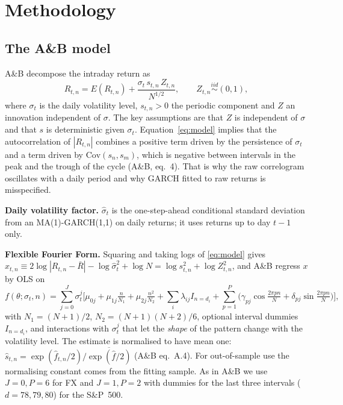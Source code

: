 \documentclass[11pt,a4paper]{article}
\begin{document}
\section{Methodology}
\label{sec:method}
\subsection{The A\&B model}
A\&B decompose the intraday return as
\begin{equation}
R_{t,n}=E(R_{t,n})+\frac{\sigma_t\,s_{t,n}\,Z_{t,n}}{N^{1/2}},\qquad Z_{t,n}\overset{iid}{\sim}(0,1),
\label{eq:model}
\end{equation}
where $\sigma_t$ is the daily volatility level, $s_{t,n}>0$ the periodic component and $Z$ an innovation independent of $\sigma$. The key assumptions are that $Z$ is independent of $\sigma$ and that $s$ is deterministic given $\sigma_t$. Equation~\eqref{eq:model} implies that the autocorrelation of $|R_{t,n}|$ combines a positive term driven by the persistence of $\sigma_t$ and a term driven by $\mathrm{Cov}(s_n,s_m)$, which is negative between intervals in the peak and the trough of the cycle (A\&B, eq.~4). That is why the raw correlogram oscillates with a daily period and why GARCH fitted to raw returns is misspecified.

\textbf{Daily volatility factor.} $\hat\sigma_t$ is the one-step-ahead conditional standard deviation from an MA(1)-GARCH(1,1) on daily returns; it uses returns up to day $t-1$ only.

\textbf{Flexible Fourier Form.} Squaring and taking logs of \eqref{eq:model} gives
$x_{t,n}\equiv 2\log|R_{t,n}-\bar R|-\log\hat\sigma_t^2+\log N=\log s_{t,n}^2+\log Z_{t,n}^2$, and A\&B regress $x$ by OLS on
\begin{equation}
f(\theta;\sigma_t,n)=\sum_{j=0}^{J}\sigma_t^j\Big[\mu_{0j}+\mu_{1j}\tfrac{n}{N_1}+\mu_{2j}\tfrac{n^2}{N_2}+\sum_{i}\lambda_{ij}I_{n=d_i}+\sum_{p=1}^{P}\big(\gamma_{pj}\cos\tfrac{2\pi pn}{N}+\delta_{pj}\sin\tfrac{2\pi pn}{N}\big)\Big],
\label{eq:fff}
\end{equation}
with $N_1=(N+1)/2$, $N_2=(N+1)(N+2)/6$, optional interval dummies $I_{n=d_i}$, and interactions with $\sigma_t^j$ that let the \emph{shape} of the pattern change with the volatility level. The estimate is normalised to have mean one: $\hat s_{t,n}=\exp(\hat f_{t,n}/2)/\overline{\exp(\hat f/2)}$ (A\&B eq.~A.4). For out-of-sample use the normalising constant comes from the fitting sample. As in A\&B we use $J=0,P=6$ for FX and $J=1,P=2$ with dummies for the last three intervals ($d=78,79,80$) for the S\&P~500.
\end{document}
